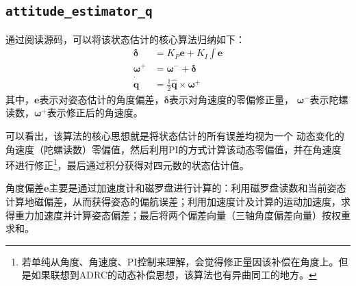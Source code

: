 \subsection{\texttt{attitude_estimator_q}}
通过阅读源码，可以将该状态估计的核心算法归纳如下：
\begin{align*}
    \bm{\delta} &= K_P \bm{e} + K_I \int \bm{e} \\
    \bm{\omega}^+ &= \bm{\omega}^- + \bm{\delta} \\
    \dot{\hat{\bm{q}}} &= \frac 1 2 \hat{\bm{q}} \times \bm{\omega}^+
\end{align*}
其中，$\bm{e}$表示对姿态估计的角度偏差，$\bm{\delta}$表示对角速度的零偏修正量，
$\bm{\omega}^-$表示陀螺读数，$\bm{\omega}^+$表示修正后的角速度。


可以看出，该算法的核心思想就是将状态估计的{\color{red}所有误差}均视为一个{\color{red} 动态变化的角速度（陀螺读数）零偏值}，然后利用PI的方式计算该动态零偏值，并在{\color{red}角速度环}进行修正\footnote{若单纯从角度、角速度、PI控制来理解，会觉得修正量因该补偿在角度上。但是如果联想到ADRC的{\color{red}动态补偿}思想，该算法也有异曲同工的地方。}，最后通过积分获得对四元数的状态估计值。

角度偏差$\bm{e}$主要是通过加速度计和磁罗盘进行计算的：利用磁罗盘读数和当前姿态计算地磁偏差，从而获得姿态的偏航误差；利用加速度计及计算的运动加速度，求得重力加速度并计算姿态偏差；最后将两个偏差向量（三轴角度偏差向量）按权重求和。



